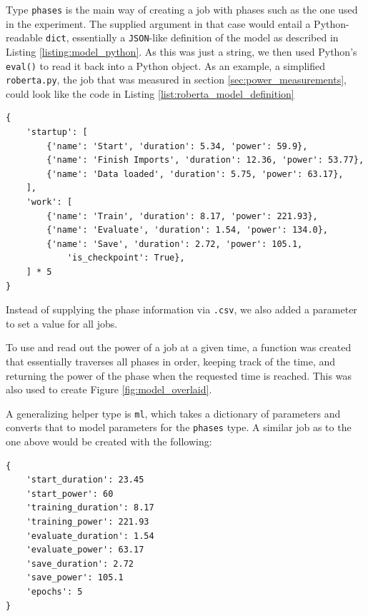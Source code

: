 Type \verb|phases| is the main way of creating a job with phases such as the one used in the experiment. The supplied argument in that case would entail a Python-readable \verb|dict|, essentially a \verb|JSON|-like definition of the model as described in Listing \ref{listing:model_python}.
As this was just a string, we then used Python's \verb|eval()| to read it back into a Python object.
As an example, a simplified \verb|roberta.py|, the job that was measured in section \ref{sec:power_measurements}, could look like the code in Listing \ref{list:roberta_model_definition}

\begin{minipage}{\linewidth}
\begin{lstlisting}[frame=single, numbers=none, caption={Simplified definition for a job similar to the experiment}, label={list:roberta_model_definition}, basicstyle=\ttfamily]
{
    'startup': [
        {'name': 'Start', 'duration': 5.34, 'power': 59.9},
        {'name': 'Finish Imports', 'duration': 12.36, 'power': 53.77},
        {'name': 'Data loaded', 'duration': 5.75, 'power': 63.17}, 
    ],
    'work': [
        {'name': 'Train', 'duration': 8.17, 'power': 221.93}, 
        {'name': 'Evaluate', 'duration': 1.54, 'power': 134.0}, 
        {'name': 'Save', 'duration': 2.72, 'power': 105.1,
            'is_checkpoint': True}, 
    ] * 5
}
\end{lstlisting}
\end{minipage}

Instead of supplying the phase information via \verb|.csv|, we also added a parameter to set a value for all jobs.

To use \modelname{} and read out the power of a job at a given time, a function was created that essentially traverses all phases in order, keeping track of the time, and returning the power of the phase when the requested time is reached. 
This was also used to create Figure \ref{fig:model_overlaid}.

A generalizing helper type is \verb|ml|, which takes a dictionary of parameters and converts that to model parameters for the \verb|phases| type. A similar job as to the one above would be created with the following:

\begin{minipage}{\linewidth}
\begin{lstlisting}[frame=single, numbers=none, caption={Generic model definition for machine learning jobs}, label={list:roberta_model_definition_generic}, basicstyle=\ttfamily]
{
    'start_duration': 23.45
    'start_power': 60
    'training_duration': 8.17
    'training_power': 221.93
    'evaluate_duration': 1.54
    'evaluate_power': 63.17
    'save_duration': 2.72
    'save_power': 105.1
    'epochs': 5
}
\end{lstlisting}
\end{minipage}

